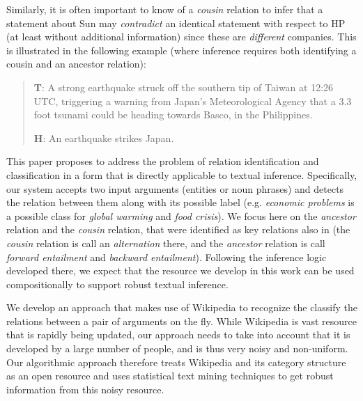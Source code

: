 Similarly, it is often important to know of a {\em cousin}
relation to infer that a statement about Sun may {\em
contradict} an identical statement with respect to HP (at least
without additional information) since these are {\em different}
companies. This is illustrated in the following example (where
inference requires both identifying a cousin and an
ancestor relation):

{\small
\begin{quote}

{\bf T}: A strong earthquake struck off the southern tip of
Taiwan at 12:26 UTC, triggering a warning from Japan's
Meteorological Agency that a 3.3 foot tsunami could be heading
towards Basco, in the Philippines.

{\bf H}: An earthquake strikes Japan.
\end{quote}
}

This paper proposes to address the problem of relation
identification and classification in a form that is directly
applicable to textual inference.
%
Specifically, our system accepts two input arguments (entities
or noun phrases) and detects the relation between them along
with its possible label (e.g. {\em economic problems} is a
possible class for {\em global warming} and {\em food crisis}).
We focus here on the {\em ancestor} relation and the {\em
cousin} relation, that were identified as key relations also
in \cite{maccartney-manning:2008:PAPERS} (the {\em cousin}
relation is call an {\em alternation} there, and the {\em ancestor} relation is call {\em forward entailment} and {\em backward entailment}). Following the
inference logic developed there, we expect that the resource we
develop in this work can be used compositionally  to support
robust textual inference.


We develop an approach that makes use of Wikipedia to recognize
the classify the relations between a pair of arguments on the
fly. While Wikipedia is vast resource that is rapidly being
updated, our approach needs to take into account that it is
developed by a large number of people, and is thus very noisy
and non-uniform. Our algorithmic approach therefore treats
Wikipedia and its category structure as an open resource and
uses statistical text mining techniques to get robust
information from this noisy resource.

